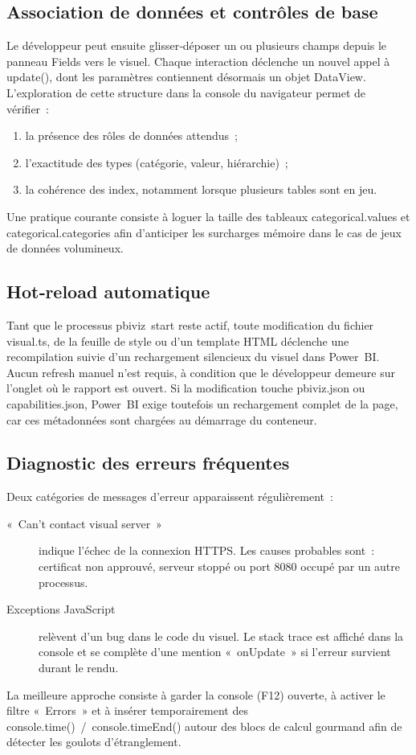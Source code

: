 \subsection{Association de données et contrôles de base}

Le développeur peut ensuite glisser‑déposer un ou plusieurs champs depuis le panneau Fields vers le visuel. Chaque interaction déclenche un nouvel appel à update(), dont les paramètres contiennent désormais un objet DataView. L’exploration de cette structure dans la console du navigateur permet de vérifier :
\begin{enumerate}
  \item la présence des rôles de données attendus ;
  \item l’exactitude des types (catégorie, valeur, hiérarchie) ;
  \item la cohérence des index, notamment lorsque plusieurs tables sont en jeu.
\end{enumerate}
Une pratique courante consiste à loguer la taille des tableaux categorical.values et categorical.categories afin d’anticiper les surcharges mémoire dans le cas de jeux de données volumineux.

\subsection{Hot‑reload automatique}

Tant que le processus pbiviz start reste actif, toute modification du fichier visual.ts, de la feuille de style ou d’un template HTML déclenche une recompilation suivie d’un rechargement silencieux du visuel dans Power BI. Aucun refresh manuel n’est requis, à condition que le développeur demeure sur l’onglet où le rapport est ouvert. Si la modification touche pbiviz.json ou capabilities.json, Power BI exige toutefois un rechargement complet de la page, car ces métadonnées sont chargées au démarrage du conteneur.

\subsection{Diagnostic des erreurs fréquentes}

Deux catégories de messages d’erreur apparaissent régulièrement :
\begin{description}
  \item[« Can’t contact visual server »] indique l’échec de la connexion HTTPS. Les causes probables sont : certificat non approuvé, serveur stoppé ou port 8080 occupé par un autre processus.
  \item[Exceptions JavaScript] relèvent d’un bug dans le code du visuel. Le stack trace est affiché dans la console et se complète d’une mention « onUpdate » si l’erreur survient durant le rendu.
\end{description}
La meilleure approche consiste à garder la console (F12) ouverte, à activer le filtre « Errors » et à insérer temporairement des console.time() / console.timeEnd() autour des blocs de calcul gourmand afin de détecter les goulots d’étranglement.

